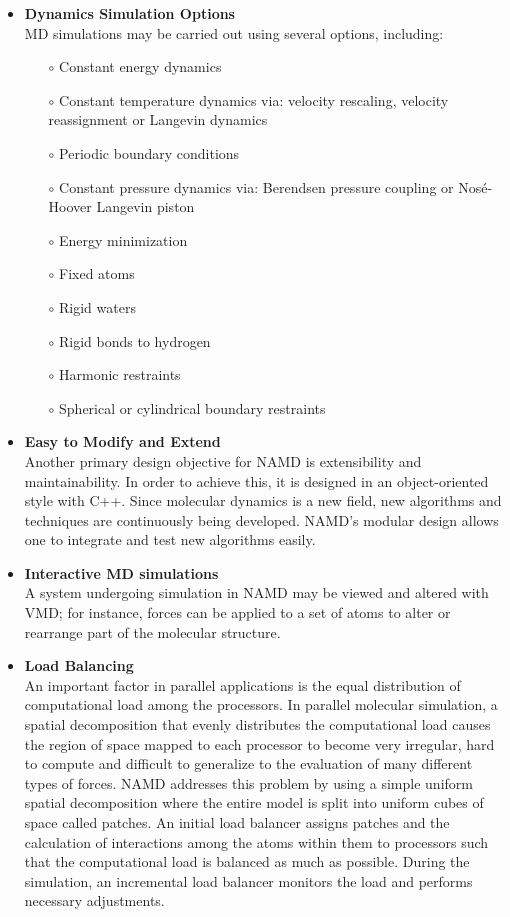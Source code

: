 \begin{itemize}
\item \textbf{Dynamics Simulation Options}\\
MD simulations may be carried out using several options, including:
\begin{itemize}
\item[$\circ$] Constant energy dynamics
\item[$\circ$] Constant temperature dynamics via: velocity rescaling, velocity reassignment or Langevin dynamics
\item[$\circ$] Periodic boundary conditions
\item[$\circ$] Constant pressure dynamics via: Berendsen pressure coupling or Nos\'{e}-Hoover Langevin piston
\item[$\circ$] Energy minimization
\item[$\circ$] Fixed atoms
\item[$\circ$] Rigid waters
\item[$\circ$] Rigid bonds to hydrogen
\item[$\circ$] Harmonic restraints
\item[$\circ$] Spherical or cylindrical boundary restraints
\end{itemize}
\item \textbf{Easy to Modify and Extend}\\
Another primary design objective for NAMD is extensibility and maintainability. In order to achieve this, it is designed in an object-oriented style with C++. Since molecular dynamics is a new field, new algorithms and techniques are continuously being developed. NAMD's modular design allows one to integrate and test new algorithms easily. 
\item \textbf{Interactive MD simulations}\\
A system undergoing simulation in NAMD may be viewed and altered with VMD; for instance, forces can be applied to a set of atoms to alter or rearrange part of the molecular structure. 
\item \textbf{Load Balancing}\\
An important factor in parallel applications is the equal distribution of computational load among the processors. In parallel molecular simulation, a spatial decomposition that evenly distributes the computational load causes the region of space mapped to each processor to become very irregular, hard to compute and difficult to generalize to the evaluation of many different types of forces. NAMD addresses this problem by using a simple uniform spatial decomposition where the entire model is split into uniform cubes of space called patches. An initial load balancer assigns patches and the calculation of interactions among the atoms within them to processors such that the computational load is balanced as much as possible. During the simulation, an incremental load balancer monitors the load and performs necessary adjustments.
\end{itemize}

